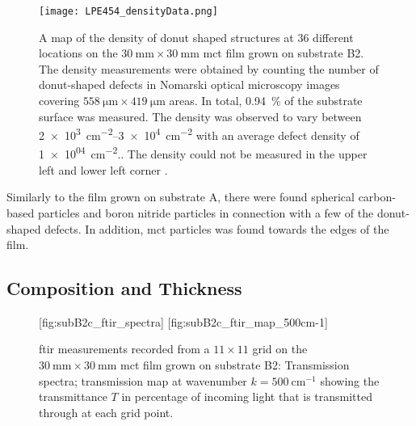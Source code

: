 
\begin{figure}[htbp]
    \centering
    \texttt{[image: LPE454\_densityData.png]}
    \caption[Map of the density of donut shaped structures on the \ac{mct} film grown on substrate B2.]{A map of the density of donut shaped structures at 36 different locations on the $\SI{30}{\milli\metre}\times\SI{30}{\milli\metre}$ \ac{mct} film grown on substrate B2. The density measurements were obtained by counting the number of donut-shaped defects in Nomarski optical microscopy images covering $\SI{558}{\micro\metre}\times\SI{419}{\micro\metre}$ areas. In total, \SI{0.94}{\percent} of the substrate surface was measured. The density was observed to vary between \SIrange{2e+3}{3e+4}{\centi\metre^{-2}} with an average defect density of \SI{1e+04}{\centi\metre^{-2}}.. The density could not be measured in the upper left and lower left corner .}
    \label{fig:LPE454_densityData}
\end{figure}

Similarly to the film grown on substrate A, there were found spherical carbon-based particles and boron nitride particles in connection with a few of the donut-shaped defects. In addition, \ac{mct} particles was found towards the edges of the film.

\subsection{Composition and Thickness}


\begin{figure}[htbp]
    \centering
    [fig:subB2c_ftir_spectra]
    \hfill
    [fig:subB2c_ftir_map_500cm-1]
    \caption[\Ac{ftir} measurements of the \ac{mct} film grown on substrate B2.]{\Ac{ftir} measurements recorded from a $11\times11$ grid on the $\SI{30}{\milli\metre}\times\SI{30}{\milli\metre}$ \ac{mct} film grown on substrate B2:  Transmission spectra;  transmission map at wavenumber $k=\SI{500}{\centi\metre^{-1}}$ showing the transmittance $T$ in percentage of incoming light that is transmitted through at each grid point.}
\end{figure}


